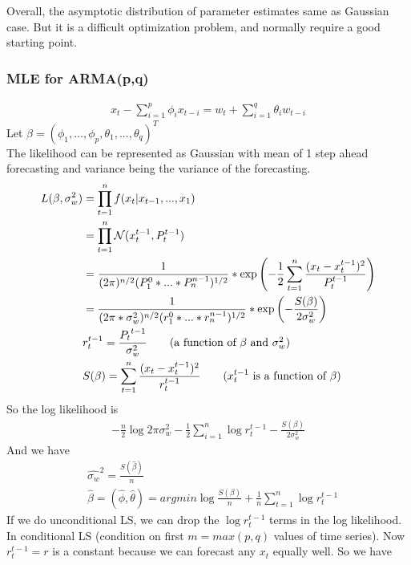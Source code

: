 Overall, the asymptotic distribution of parameter estimates same as Gaussian case. But it is a difficult optimization problem, and normally require a good starting point. 

\subsubsection{MLE for ARMA(p,q)} 
\begin{align*}
    x_t - \sum_{i=1}^p \phi_i x_{t-i} = w_t + \sum_{i=1}^q \theta_i w_{t-i}
\end{align*}
Let $\beta = (\phi_1, ..., \phi_p, \theta_1, ..., \theta_q)^T$\\
The likelihood can be represented as Gaussian with mean of 1 step ahead forecasting and variance being the variance of the forecasting. 
    \begin{align*}
        L(\beta, \sigma_w^2) 
        & = \prod_{t=1}^n f(x_t | x_{t-1}, ..., x_1) \\
        & = \prod_{t=1}^n \mathcal{N}(x_t^{t-1}, P_t^{t-1}) \\
        & = \frac{1}{(2\pi)^{n/2}(P_1^0 * ... * P_n^{n-1})^{1/2}} * \exp \left( -\frac{1}{2} \sum_{t=1}^n \frac{(x_t - x_t^{t-1})^2}{P_t^{t-1}}  \right)\\
        & = \frac{1}{(2\pi * \sigma_w^2)^{n/2}(r_1^0 * ... * r_n^{n-1})^{1/2}} * \exp \left(- \frac{S(\beta)}{2\sigma_w^2}  \right) \\
        & r_t^{t-1} = \frac{{P_t}^{t-1}}{\sigma_w^2} \tag{a function of $\beta$ and $\sigma_w^2$}\\
        & S(\beta) = \sum_{t=1}^n \frac{(x_t - x_t^{t-1})^2}{r_t^{t-1}} \tag{$x_t^{t-1}$ is a function of $\beta$}
    \end{align*}
So the log likelihood is 
    \begin{align*}
        -\frac{n}{2} \log 2\pi \sigma_w^2 - \frac{1}{2} \sum_{i=1}^n \log r_t^{t-1} - \frac{S(\beta)}{2\sigma_w^2}
    \end{align*}
And we have 
    \begin{align*}
        & \hat{\sigma_w}^2 = \frac{S(\hat{\beta})}{n}\\
        & \hat{\beta} = (\hat{\phi}, \hat{\theta}) = argmin \log \frac{S(\beta)}{n} + \frac{1}{n}\sum_{t=1}^n \log r_t^{t-1}
    \end{align*}
If we do unconditional LS, we can drop the $\log r_t^{t-1}$ terms in the log likelihood. In conditional LS (condition on first $m = max(p,q)$ values of time series). Now $r_t^{t-1} = r$ is a constant because we can forecast any $x_t$ equally well. So we have 

